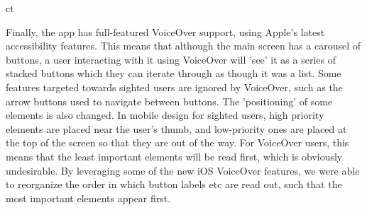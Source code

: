 ct\documentclass[a4paper,11pt]{article}
\begin{document}
Finally, the app has full-featured VoiceOver support, using Apple's latest accessibility features. This means that although the main screen has a carousel of buttons, a user interacting with it using VoiceOver will 'see' it as a series of stacked buttons which they can iterate through as though it was a list. Some features targeted towards sighted users are ignored by VoiceOver, such as the arrow buttons used to navigate between buttons. The 'positioning' of some elements is also changed. In mobile design for sighted users, high priority elements are placed near the user's thumb, and low-priority ones are placed at the top of the screen so that they are out of the way. For VoiceOver users, this means that the least important elements will be read first, which is obviously undesirable. By leveraging some of the new iOS VoiceOver features, we were able to reorganize the order in which button labels etc are read out, such that the most important elements appear first.
\end{document}
